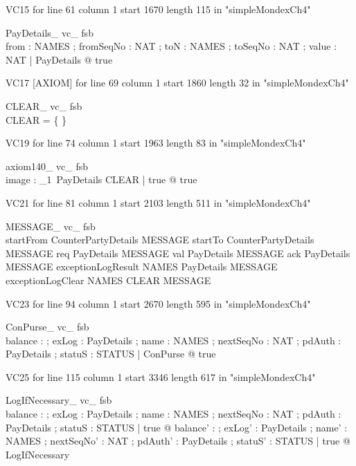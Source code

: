 \documentclass{article}
\begin{document}
VC15 for line 61 column 1 start 1670 length 115 in "simpleMondexCh4"
\begin{theorem}{ PayDetails\_ vc\_ fsb}\\
 \exists from : NAMES ; fromSeqNo : NAT ; toN : NAMES ; toSeqNo : NAT ; value : NAT | PayDetails @ true \\

\end{theorem}

VC17 [AXIOM] for line 69 column 1 start 1860 length 32 in "simpleMondexCh4"
\begin{theorem}{ CLEAR\_ vc\_ fsb}\\
 \lnot CLEAR = \{ \} \\

\end{theorem}

VC19 for line 74 column 1 start 1963 length 83 in "simpleMondexCh4"
\begin{theorem}{ axiom140\_ vc\_ fsb}\\
 \exists image : {\power}_{1}~PayDetails \inj CLEAR | true @ true \\

\end{theorem}

VC21 for line 81 column 1 start 2103 length 511 in "simpleMondexCh4"
\begin{theorem}{ MESSAGE\_ vc\_ fsb}\\
 startFrom \in CounterPartyDetails \inj MESSAGE \land startTo \in CounterPartyDetails \inj MESSAGE \land req \in PayDetails \inj MESSAGE \land val \in PayDetails \inj MESSAGE \land ack \in PayDetails \inj MESSAGE \land exceptionLogResult \in NAMES \cross PayDetails \inj MESSAGE \land exceptionLogClear \in NAMES \cross CLEAR \inj MESSAGE \\

\end{theorem}

VC23 for line 94 column 1 start 2670 length 595 in "simpleMondexCh4"
\begin{theorem}{ ConPurse\_ vc\_ fsb}\\
 \exists balance : \nat ; exLog : \power PayDetails ; name : NAMES ; nextSeqNo : NAT ; pdAuth : PayDetails ; statuS : STATUS | ConPurse @ true \\

\end{theorem}

VC25 for line 115 column 1 start 3346 length 617 in "simpleMondexCh4"
\begin{theorem}{ LogIfNecessary\_ vc\_ fsb}\\
 \forall balance : \nat ; exLog : \power PayDetails ; name : NAMES ; nextSeqNo : NAT ; pdAuth : PayDetails ; statuS : STATUS | true @ \exists balance' : \nat ; exLog' : \power PayDetails ; name' : NAMES ; nextSeqNo' : NAT ; pdAuth' : PayDetails ; statuS' : STATUS | true @ LogIfNecessary \\

\end{theorem}
\end{document}
